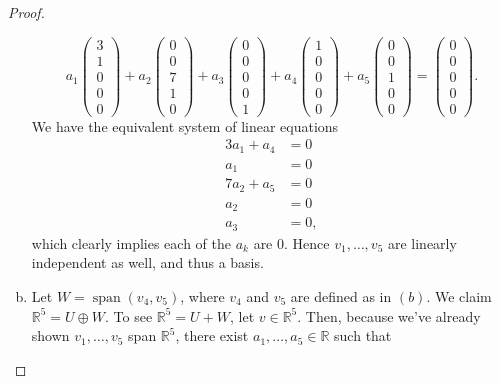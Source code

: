 \documentclass{extarticle}
\newcommand{\R}{\mathbb{R}}
\DeclareMathOperator{\Span}{span}
\begin{document}
\begin{proof}
\begin{enumerate}[(a)]
\begin{equation*}
a_1\begin{pmatrix}3\\1\\0\\0\\0\end{pmatrix} + a_2\begin{pmatrix}0\\0\\7\\1\\0\end{pmatrix} + a_3\begin{pmatrix}0\\0\\0\\0\\1\end{pmatrix} + a_4\begin{pmatrix}1\\0\\0\\0\\0\end{pmatrix} + a_5\begin{pmatrix}0\\0\\1\\0\\0\end{pmatrix} = \begin{pmatrix}0\\0\\0\\0\\0\end{pmatrix}.
\end{equation*}
We have the equivalent system of linear equations
\begin{align*}
3a_1 + a_4 &= 0\\
a_1 &= 0\\
7a_2 + a_5 &= 0\\
a_2 &= 0\\
a_3 &= 0,
\end{align*}
which clearly implies each of the $a_k$ are $0$.  Hence $v_1,\dots,v_5$ are linearly independent as well, and thus a basis.
\item Let $W = \Span(v_4, v_5)$, where $v_4$ and $v_5$ are defined as in $(b)$.  We claim $\R^5 = U\oplus W$.  To see $\R^5 = U + W$, let $v\in\R^5$.  Then, because we've already shown $v_1,\dots, v_5$ span $\R^5$, there exist $a_1,\dots, a_5\in\R$ such that 
\begin{equation*}

\end{equation*}
\end{enumerate}
\end{proof}
\end{document}
